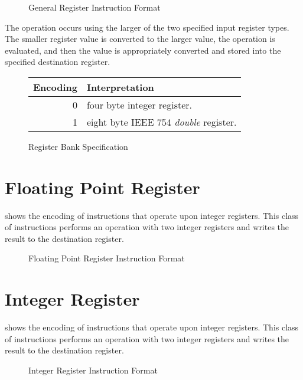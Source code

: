 \begin{figure}[h!]
  \centering
    \usebox{\gregtypebox}
    \caption{General Register Instruction Format}
    \label{fig:general-register-format}
\end{figure}

The operation occurs using the larger of the two specified input
register types.  The smaller register value is converted to the larger
value, the operation is evaluated, and then the value is appropriately
converted and stored into the specified destination register.

\begin{figure}[h!]
  \centering
    \begin{tabular}{r|l}
      Encoding & Interpretation \\
      \hline 0 & four byte integer register. \\
      1 & eight byte IEEE 754 \emph{double} register. \\
    \end{tabular}
    \caption{Register Bank Specification}
    \label{fig:register-bank}
\end{figure}


\section{Floating Point Register}

 shows the encoding of instructions
that operate upon integer registers. This class of instructions
performs an operation with two integer registers and writes the result
to the destination register.

\begin{figure}[h!]
  \centering
  \usebox{\fprtypebox}
  \caption{Floating Point Register Instruction Format}
  \label{fig:float-register-format}
\end{figure}


\section{Integer Register}

 shows the encoding of instructions
that operate upon integer registers. This class of instructions
performs an operation with two integer registers and writes the result
to the destination register.

\begin{figure}[h!]
  \centering
  \usebox{\rtypebox}
  \caption{Integer Register Instruction Format}
  \label{fig:integer-register-format}
\end{figure}


